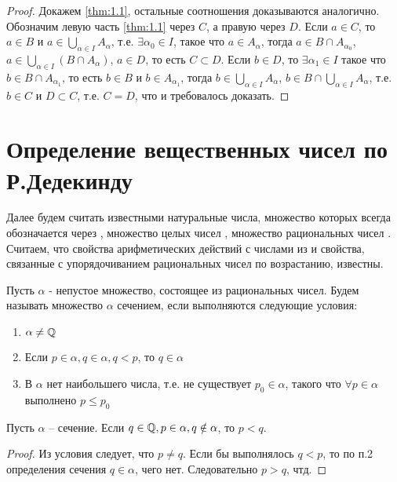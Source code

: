 \documentclass[main]{subfiles}
\begin{document}
\begin{proof}
    Докажем \eqref{thm:1.1}, остальные соотношения доказываются аналогично.
    Обозначим левую часть \eqref{thm:1.1} через $C$, а правую через $D$.
    Если $a \in C$, то $a\in B$ и $a \in \bigcup_{\alpha \in I} A_\alpha$,
    т.е. $\exists \alpha_0 \in I$, такое что $a \in A_\alpha$, тогда
    $a \in B \cap A_{\alpha_0}$, $a \in \bigcup_{\alpha \in I}(B \cap A_\alpha)$,
    $a \in D$, то есть $C \subset D$. Если $b \in D$, то $\exists \alpha_1 \in I$
    такое что $b \in B \cap A_{\alpha_1}$, то есть $b \in B$ и $b \in A_{\alpha_1}$,
    тогда $b \in \bigcup_{\alpha \in I} A_\alpha$,
    $b \in B \cap \bigcup_{\alpha \in I} A_\alpha$, т.е. $b \in C$ и $D \subset C$,
    т.е. $C = D$, что и требовалось доказать.
\end{proof}

\section{Определение вещественных чисел по Р.Дедекинду}
Далее будем считать известными натуральные числа, множество которых всегда
обозначается через \N, множество целых чисел \Z, множество
рациональных чисел \Q. Считаем, что свойства арифметических действий
с числами из \Q и свойства, связанные с упорядочиванием рациональных
чисел по возрастанию, известны.

\begin{definition}
    Пусть $\alpha$ - непустое множество, состоящее из рациональных чисел. Будем
    называть множество $\alpha$ сечением, если выполняются следующие условия:
    \begin{enumerate}
        \item $\alpha \neq \mathbb{Q}$
        \item Если $p \in \alpha, q \in \alpha, q < p$, то $q \in \alpha$
        \item В $\alpha$ нет наибольшего числа, т.е. не существует $p_0 \in \alpha$,
              такого что $\forall p \in \alpha$ выполнено $p \leq p_0$
    \end{enumerate}
\end{definition}

\begin{assertion}
    Пусть $\alpha$ -- сечение. Если $q \in \mathbb{Q}, p \in \alpha, q \notin
        \alpha$, то $p < q$.
\end{assertion}
\begin{proof}
    Из условия следует, что $p \neq q$. Если бы выполнялось $q < p$, то по п.2
    определения сечения $q \in \alpha$, чего нет. Следовательно $p > q$, чтд.
\end{proof}
\end{document}
